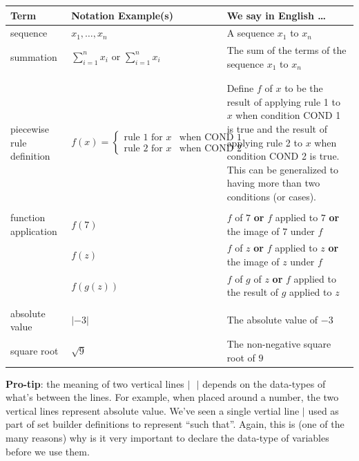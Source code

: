 \documentclass[12pt, oneside]{article}
\begin{document}
\begin{center}
\begin{tabular}{|p{1.2in}p{2.8in}p{3in}|}
\hline
{\bf Term} & {\bf Notation Example(s)} & {\bf We say in English \ldots } \\
\hline
sequence & $x_1, \ldots, x_n$ & A sequence $x_1$ to $x_n$ \\
summation & $\sum_{i=1}^n x_i$ or $\displaystyle{\sum_{i=1}^n x_i}$ & The sum of the terms of the sequence $x_1$ to $x_n$ \\
&&\\
&&\\
piecewise rule definition & $f(x) = \begin{cases} \text{rule 1 for } x & \text{when~COND 1} \\ \text{rule 2 for } x & \text{when COND 2}\end{cases}$ &
Define $f$ of $x$ to be the result of applying rule 1 to $x$ when condition COND 1 is true and the result of 
applying rule 2 to $x$ when condition COND 2 is true. This can be generalized to having more than two conditions
(or cases).\\
&&\\
function application & $f(7)$ & $f$ of $7$ {\bf or} $f$ applied to $7$ {\bf or} the image of $7$ under $f$\\
                     & $f(z)$ & $f$ of $z$ {\bf or} $f$ applied to $z$ {\bf or} the image of $z$ under $f$\\
                     & $f(g(z))$ & $f$ of $g$ of $z$ {\bf or} $f$ applied to the result of $g$ applied to $z$ \\
&&\\
absolute value & $\lvert -3 \rvert$ & The absolute value of $-3$ \\
square root & $\sqrt{9}$ & The non-negative square root of $9$ \\


\hline
\end{tabular}
\end{center}

{\bf Pro-tip}: the meaning of two vertical lines $| ~~~ |$ depends on the data-types of what's between the lines.
For example, when placed around a number, the two vertical lines represent absolute value.
We've seen a single vertial line $|$ used as part of set builder definitions to represent ``such that''.
Again, this is 
(one of the many reasons) why is it very important to declare the data-type of variables before we use them.
 
\end{document}
